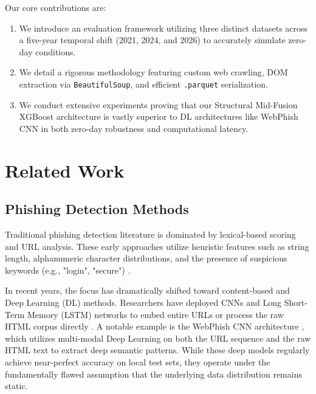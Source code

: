 \documentclass[conference]{IEEEtran}
\begin{document}
Our core contributions are:
\begin{enumerate}
    \item We introduce an evaluation framework utilizing three distinct datasets across a five-year temporal shift (2021, 2024, and 2026) to accurately simulate zero-day conditions.
    \item We detail a rigorous methodology featuring custom web crawling, DOM extraction via \texttt{BeautifulSoup}, and efficient \texttt{.parquet} serialization.
    \item We conduct extensive experiments proving that our Structural Mid-Fusion XGBoost architecture is vastly superior to DL architectures like WebPhish CNN in both zero-day robustness and computational latency.
\end{enumerate}

\section{Related Work}

\subsection{Phishing Detection Methods}
Traditional phishing detection literature is dominated by lexical-based scoring and URL analysis. These early approaches utilize heuristic features such as string length, alphanumeric character distributions, and the presence of suspicious keywords (e.g., "login", "secure") \cite{look_before_leap}. 

In recent years, the focus has dramatically shifted toward content-based and Deep Learning (DL) methods. Researchers have deployed CNNs and Long Short-Term Memory (LSTM) networks to embed entire URLs or process the raw HTML corpus directly \cite{dl_framework_phishing}. A notable example is the WebPhish CNN architecture \cite{web_phishing_dl}, which utilizes multi-modal Deep Learning on both the URL sequence and the raw HTML text to extract deep semantic patterns. While these deep models regularly achieve near-perfect accuracy on local test sets, they operate under the fundamentally flawed assumption that the underlying data distribution remains static. 
\end{document}
